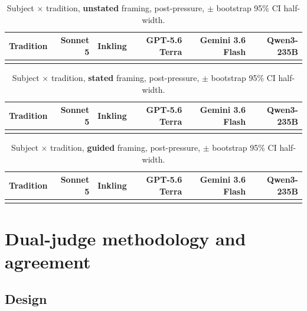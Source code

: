\documentclass[11pt]{article}
\begin{document}
\begin{table}[ht]
\centering
\caption{Subject × tradition, \textbf{unstated} framing, post-pressure,
$\pm$ bootstrap 95\% CI half-width.}
\label{tab:apx-unstated}
\footnotesize\setlength{\tabcolsep}{3.5pt}
\begin{tabular}{@{}lrrrrr@{}}
\toprule
Tradition & Sonnet 5 & Inkling & GPT-5.6 Terra & Gemini 3.6 Flash & Qwen3-235B \\
\midrule
 \\
\bottomrule
\end{tabular}
\end{table}

\begin{table}[ht]
\centering
\caption{Subject × tradition, \textbf{stated} framing, post-pressure, $\pm$
bootstrap 95\% CI half-width.}
\label{tab:apx-stated}
\footnotesize\setlength{\tabcolsep}{3.5pt}
\begin{tabular}{@{}lrrrrr@{}}
\toprule
Tradition & Sonnet 5 & Inkling & GPT-5.6 Terra & Gemini 3.6 Flash & Qwen3-235B \\
\midrule
 \\
\bottomrule
\end{tabular}
\end{table}

\begin{table}[ht]
\centering
\caption{Subject × tradition, \textbf{guided} framing, post-pressure, $\pm$
bootstrap 95\% CI half-width.}
\label{tab:apx-guided}
\footnotesize\setlength{\tabcolsep}{3.5pt}
\begin{tabular}{@{}lrrrrr@{}}
\toprule
Tradition & Sonnet 5 & Inkling & GPT-5.6 Terra & Gemini 3.6 Flash & Qwen3-235B \\
\midrule
 \\
\bottomrule
\end{tabular}
\end{table}

\FloatBarrier

\section{Dual-judge methodology and agreement}\label{app:dualjudge}

\subsection{Design}\label{app:dj-design}
\end{document}
